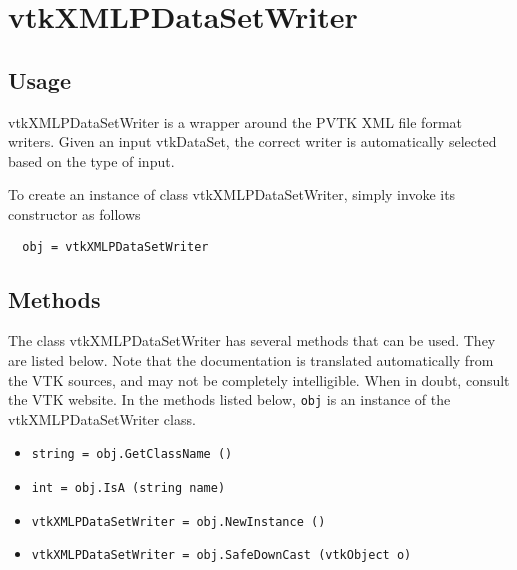 \section{vtkXMLPDataSetWriter}

\subsection{Usage}

 vtkXMLPDataSetWriter is a wrapper around the PVTK XML file format
 writers.  Given an input vtkDataSet, the correct writer is
 automatically selected based on the type of input.

To create an instance of class vtkXMLPDataSetWriter, simply
invoke its constructor as follows
\begin{verbatim}
  obj = vtkXMLPDataSetWriter
\end{verbatim}
\subsection{Methods}

The class vtkXMLPDataSetWriter has several methods that can be used.
  They are listed below.
Note that the documentation is translated automatically from the VTK sources,
and may not be completely intelligible.  When in doubt, consult the VTK website.
In the methods listed below, \verb|obj| is an instance of the vtkXMLPDataSetWriter class.
\begin{itemize}
\item  \verb|string = obj.GetClassName ()|

\item  \verb|int = obj.IsA (string name)|

\item  \verb|vtkXMLPDataSetWriter = obj.NewInstance ()|

\item  \verb|vtkXMLPDataSetWriter = obj.SafeDownCast (vtkObject o)|

\end{itemize}
